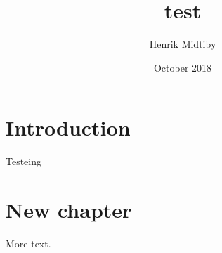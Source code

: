\documentclass{article}
\title{test}
\author{Henrik Midtiby}
\date{October 2018}
\begin{document}
\maketitle

\section{Introduction}


Testeing 

\section{New chapter}

More text.
\end{document}

